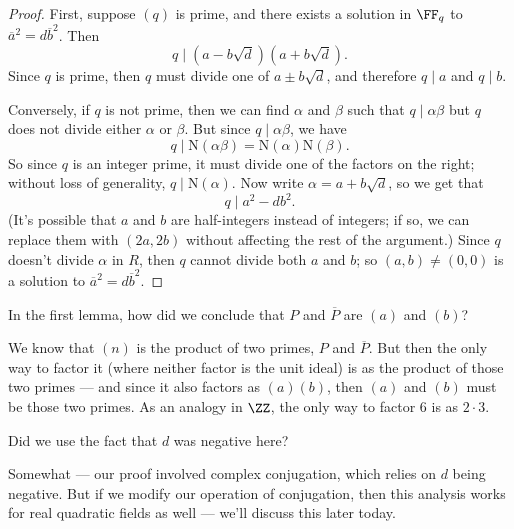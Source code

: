 \begin{proof}
First, suppose $(q)$ is prime, and there exists a solution in $\FF_q$ to $\overline{a}^2 = d\overline{b}^2$. Then \[q \mid (a - b\sqrt{d})(a + b\sqrt{d}).\] Since $q$ is prime, then $q$ must divide one of $a \pm b\sqrt{d}$, and therefore $q \mid a$ and $q \mid b$. 

Conversely, if $q$ is not prime, then we can find $\alpha$ and $\beta$ such that $q \mid \alpha\beta$ but $q$ does not divide either $\alpha$ or $\beta$. But since $q \mid \alpha\beta$, we have \[q \mid \mathrm{N}(\alpha\beta) = \mathrm{N}(\alpha)\mathrm{N}(\beta).\] So since $q$ is an integer prime, it must divide one of the factors on the right; without loss of generality, $q \mid \mathrm{N}(\alpha)$. Now write $\alpha = a + b\sqrt{d}$, so we get that \[q \mid a^2 - db^2.\] (It's possible that $a$ and $b$ are half-integers instead of integers; if so, we can replace them with $(2a, 2b)$ without affecting the rest of the argument.) Since $q$ doesn't divide $\alpha$ in $R$, then $q$ cannot divide both $a$ and $b$; so $(a, b) \neq (0, 0)$ is a solution to $\overline{a}^2 = d\overline{b}^2$. %
\end{proof}

\begin{question}
In the first lemma, how did we conclude that $P$ and $\overline{P}$ are $(a)$ and $(b)$?
\end{question}

\begin{ans}
We know that $(n)$ is the product of two primes, $P$ and $\overline{P}$. But then the only way to factor it (where neither factor is the unit ideal) is as the product of those two primes --- and since it also factors as $(a)(b)$, then $(a)$ and $(b)$ must be those two primes. As an analogy in $\ZZ$, the only way to factor $6$ is as $2\cdot 3$.
\end{ans}

\begin{question}
Did we use the fact that $d$ was negative here?
\end{question}

\begin{ans}
Somewhat --- our proof involved complex conjugation, which relies on $d$ being negative. But if we modify our operation of conjugation, then this analysis works for real quadratic fields as well --- we'll discuss this later today. 
\end{ans}

